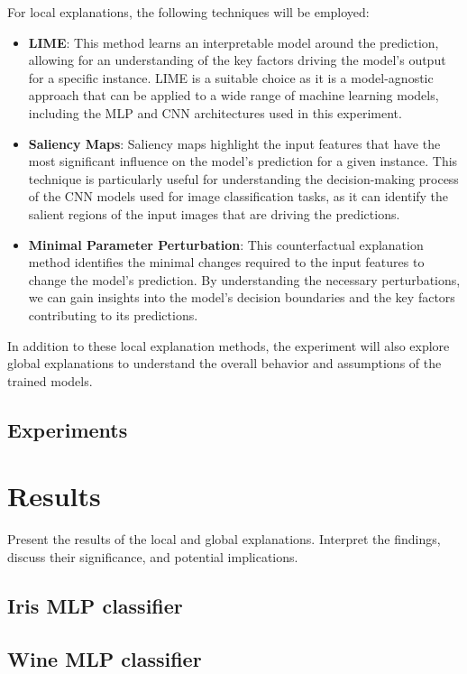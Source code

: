 \documentclass[journal, a4paper]{IEEEtran}
\begin{document}
For local explanations, the following techniques will be employed:

\begin{itemize}
    \item \textbf{LIME}: This method learns an interpretable model around the prediction, allowing for an understanding of the key factors driving the model's output for a specific instance. LIME is a suitable choice as it is a model-agnostic approach that can be applied to a wide range of machine learning models, including the MLP and CNN architectures used in this experiment.
    \item \textbf{Saliency Maps}: Saliency maps highlight the input features that have the most significant influence on the model's prediction for a given instance. This technique is particularly useful for understanding the decision-making process of the CNN models used for image classification tasks, as it can identify the salient regions of the input images that are driving the predictions.
    \item \textbf{Minimal Parameter Perturbation}: This counterfactual explanation method identifies the minimal changes required to the input features to change the model's prediction. By understanding the necessary perturbations, we can gain insights into the model's decision boundaries and the key factors contributing to its predictions.
\end{itemize}

In addition to these local explanation methods, the experiment will also explore global explanations to understand the overall behavior and assumptions of the trained models.

\subsection{Experiments}\label{subsec:experiments}

\section{Results}\label{sec:results}
Present the results of the local and global explanations.
Interpret the findings, discuss their significance, and potential implications.

\subsection{Iris MLP classifier}\label{subsec:experiment-iris}
\subsection{Wine MLP classifier}\label{subsec:experiment-wine}
\end{document}
